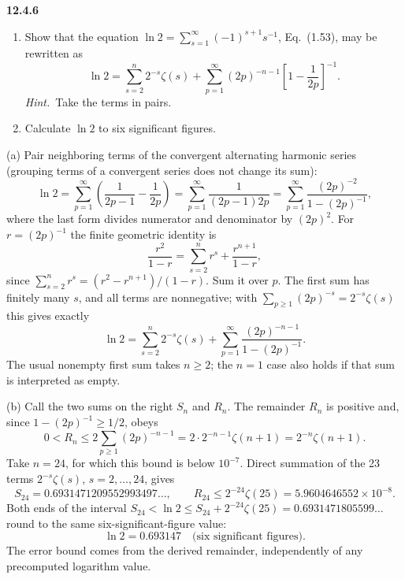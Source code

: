 \par\bigskip
\noindent\textbf{12.4.6}\quad
\begin{enumerate}
\item[(a)] Show that the equation
  $\ln2=\sum_{s=1}^{\infty}(-1)^{s+1}s^{-1}$, Eq.~(1.53), may be rewritten as
  \[
  \ln2=\sum_{s=2}^{n}2^{-s}\zeta(s)
  +\sum_{p=1}^{\infty}(2p)^{-n-1}\left[1-\frac{1}{2p}\right]^{-1}.
  \]
  \emph{Hint.}~Take the terms in pairs.
\item[(b)] Calculate $\ln2$ to six significant figures.
\end{enumerate}
\solution
(a) Pair neighboring terms of the convergent alternating harmonic series
(grouping terms of a convergent series does not change its sum):
\[
\ln2=\sum_{p=1}^\infty\left(\frac1{2p-1}-\frac1{2p}\right)
=\sum_{p=1}^\infty\frac1{(2p-1)2p}
=\sum_{p=1}^\infty\frac{(2p)^{-2}}{1-(2p)^{-1}},
\]
where the last form divides numerator and denominator by $(2p)^2$.
For $r=(2p)^{-1}$ the finite geometric identity is
\[
\frac{r^2}{1-r}=\sum_{s=2}^{n}r^s+\frac{r^{n+1}}{1-r},
\]
since $\sum_{s=2}^nr^s=(r^2-r^{n+1})/(1-r)$.
Sum it over $p$. The first sum has finitely many $s$, and all terms
are nonnegative; with $\sum_{p\ge1}(2p)^{-s}=2^{-s}\zeta(s)$ this gives
exactly
\[
\boxed{\ln2=\sum_{s=2}^{n}2^{-s}\zeta(s)
+\sum_{p=1}^\infty\frac{(2p)^{-n-1}}{1-(2p)^{-1}}}.
\]
The usual nonempty first sum takes $n\ge2$; the $n=1$ case also holds
if that sum is interpreted as empty.

(b) Call the two sums on the right $S_n$ and $R_n$. The remainder $R_n$
is positive and, since $1-(2p)^{-1}\ge1/2$, obeys
\[
0<R_n\le2\sum_{p\ge1}(2p)^{-n-1}=2\cdot2^{-n-1}\zeta(n+1)
=2^{-n}\zeta(n+1).
\]
Take $n=24$, for which this bound is below $10^{-7}$. Direct summation
of the 23 terms $2^{-s}\zeta(s)$, $s=2,\ldots,24$, gives
\[
S_{24}=0.6931471209552993497\ldots,\qquad
R_{24}\le2^{-24}\zeta(25)=5.9604646552\times10^{-8}.
\]
Both ends of the interval
$S_{24}<\ln2\le S_{24}+2^{-24}\zeta(25)=0.6931471805599\ldots$
round to the same six-significant-figure value:
\[
\boxed{\ln2=0.693147\quad\text{(six significant figures)}}.
\]
The error bound comes from the derived remainder, independently of any
precomputed logarithm value.

